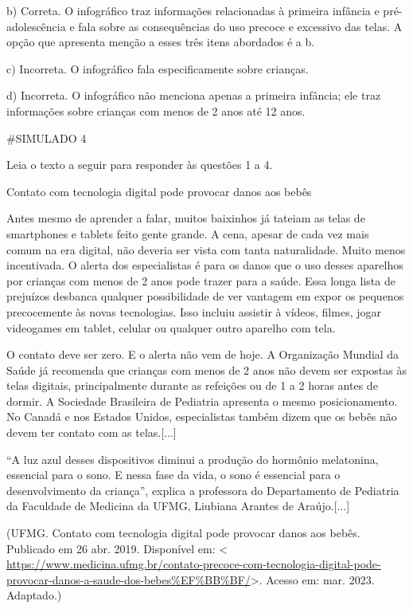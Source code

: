 {b) Correta. O infográfico traz informações relacionadas à primeira
infância e pré-adolescência e fala sobre as consequências do uso precoce
e excessivo das telas. A opção que apresenta menção a esses três itens
abordados é a b.

c) Incorreta. O infográfico fala especificamente sobre crianças.

d) Incorreta. O infográfico não menciona apenas a primeira infância; ele
traz informações sobre crianças com menos de 2 anos até 12 anos.

\#SIMULADO 4

Leia o texto a seguir para responder às questões 1 a 4.

Contato com tecnologia digital pode provocar danos aos bebês﻿

Antes mesmo de aprender a falar, muitos baixinhos já tateiam as telas de
smartphones e tablets feito gente grande. A cena, apesar de cada vez
mais comum na era digital, não deveria ser vista com tanta naturalidade.
Muito menos incentivada. O alerta dos especialistas é para os danos que
o uso desses aparelhos por crianças com menos de 2 anos pode trazer para
a saúde. Essa longa lista de prejuízos desbanca qualquer possibilidade
de ver vantagem em expor os pequenos precocemente às novas tecnologias.
Isso incluiu assistir à vídeos, filmes, jogar videogames em tablet,
celular ou qualquer outro aparelho com tela.

O contato deve ser zero. E o alerta não vem de hoje. A Organização
Mundial da Saúde já recomenda que crianças com menos de 2 anos não devem
ser expostas às telas digitais, principalmente durante as refeições ou
de 1 a 2 horas antes de dormir. A Sociedade Brasileira de Pediatria
apresenta o mesmo posicionamento. No Canadá e nos Estados Unidos,
especialistas também dizem que os bebês não devem ter contato com as
telas.{[}...{]}

``A luz azul desses dispositivos diminui a produção do hormônio
melatonina, essencial para o sono. E nessa fase da vida, o sono é
essencial para o desenvolvimento da criança'', explica a professora do
Departamento de Pediatria da Faculdade de Medicina da UFMG, Liubiana
Arantes de Araújo.{[}...{]}

(UFMG. Contato com tecnologia digital pode provocar danos aos bebês﻿.
Publicado em 26 abr. 2019. Disponível em: \textless{}
\url{https://www.medicina.ufmg.br/contato-precoce-com-tecnologia-digital-pode-provocar-danos-a-saude-dos-bebes\%EF\%BB\%BF/}\textgreater.
Acesso em: mar. 2023. Adaptado.)

}
